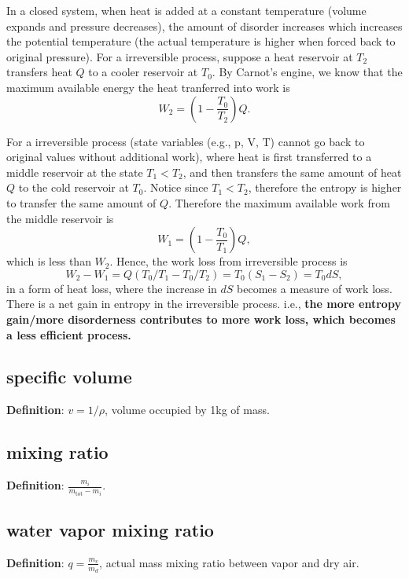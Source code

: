 In a closed system, when heat is added at a constant temperature (volume expands and pressure
decreases), the amount of disorder increases which increases the potential temperature (the actual
temperature is higher when forced back to original pressure). For a irreversible process, suppose a
heat reservoir at $T_2$ transfers heat $Q$ to a cooler reservoir at $T_0$. By Carnot's engine, we
know that the maximum available energy the heat tranferred into work is
\begin{equation}
    W_2 = (1-\frac{T_0}{T_2})Q.
\end{equation}

For a irreversible process (state variables (e.g., p, V, T) cannot go back to original values
without additional work), where heat is first transferred to a middle reservoir at the state $T_1 <
T_2$, and then transfers the same amount of heat $Q$ to the cold reservoir at $T_0$.
Notice since $T_1 < T_2$, therefore the entropy is higher to transfer the same amount of $Q$.
Therefore the maximum available work from the middle reservoir is
\begin{equation}
    W_1 = (1-\frac{T_0}{T_1})Q,
\end{equation}
which is less than $W_2$. Hence, the work loss from irreversible process is 
\begin{equation}
    W_2-W_1 = Q(T_0/T_1 - T_0/T_2) = T_0(S_1 - S_2) = T_0 dS,
\end{equation} 
in a form of heat loss, where the increase in $dS$ becomes a measure of work loss. 
There is a net gain in entropy in the irreversible process.
i.e., {\bf the more entropy gain/more disorderness contributes to more work loss, which becomes a
less efficient process.}

\subsection{specific volume}
{\bf Definition}: $v = 1/\rho$, volume occupied by 1kg of mass.

\subsection{mixing ratio}
{\bf Definition}: $ \frac{m_i}{m_{\text{tot}}-m_i} $.

\subsection{water vapor mixing ratio}
{\bf Definition}: $ q = \frac{m_v}{m_d}$, actual mass mixing ratio between vapor and dry air.

